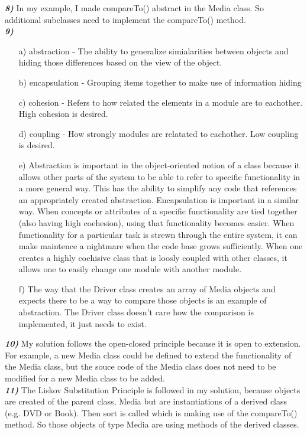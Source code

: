 \documentclass[10pt,letterpaper]{article}
\begin{document}
\textbf{\textit{8)}}
  In my example, I made compareTo() abstract in the Media class.  So additional subclasses need to implement the compareTo() method.\\

\textbf{\textit{9)}}
\begin{enumerate}
  \item[a)] abstraction - The ability to generalize simialarities between objects and hiding those differences based on the view of the object.
  \item[b)] encapsulation - Grouping items together to make use of information hiding
  \item[c)] cohesion - Refers to how related the elements in a module are to eachother.  High cohesion is desired.
  \item[d)] coupling - How strongly modules are relatated to eachother. Low coupling is desired.
  \item[e)] Abstraction is important in the object-oriented notion of a class because it allows other parts of the system to be able to refer to specific functionality in a more general way.  This has the ability to simplify any code that references an appropriately created abstraction.
       Encapsulation is important in a similar way.  When concepts or attributes of a specific functionality are tied together (also having high coehesion), using that functionality becomes easier.  When functionality for a particular task is strewn through the entire system, it can make maintence a nightmare when the code base grows sufficiently.
       When one creates a highly coehisive class that is loosly coupled with other classes, it allows one to easily change one module with another module.
  \item[f)] The way that the Driver class creates an array of Media objects and expects there to be a way to compare those objects is an example of abstraction.  The Driver class doesn't care how the comparison is implemented, it just needs to exist.
\end{enumerate}

\textbf{\textit{10)}}
My solution follows the open-closed principle because it is open to extension.  For example, a new Media class could be defined to extend the functionality of the Media class, but the souce code of the Media class does not need to be modified for a new Media class to be added.\\

\textbf{\textit{11)}}
The Liskov Substitution Principle is followed in my solution, because objects are created of the parent class, Media but are instantiations of a derived class (e.g. DVD or Book).  Then sort is called which is making use of the compareTo() method.  So those objects of type Media are using methods of the derived classes.\\
\end{document}
